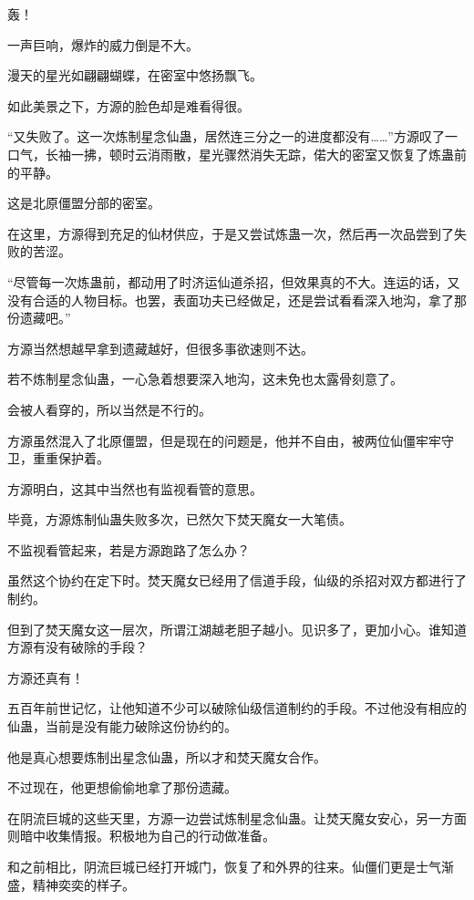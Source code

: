 
\begin{this_body}

轰！

一声巨响，爆炸的威力倒是不大。

漫天的星光如翩翩蝴蝶，在密室中悠扬飘飞。

如此美景之下，方源的脸色却是难看得很。

“又失败了。这一次炼制星念仙蛊，居然连三分之一的进度都没有……”方源叹了一口气，长袖一拂，顿时云消雨散，星光骤然消失无踪，偌大的密室又恢复了炼蛊前的平静。

这是北原僵盟分部的密室。

在这里，方源得到充足的仙材供应，于是又尝试炼蛊一次，然后再一次品尝到了失败的苦涩。

“尽管每一次炼蛊前，都动用了时济运仙道杀招，但效果真的不大。连运的话，又没有合适的人物目标。也罢，表面功夫已经做足，还是尝试看看深入地沟，拿了那份遗藏吧。”

方源当然想越早拿到遗藏越好，但很多事欲速则不达。

若不炼制星念仙蛊，一心急着想要深入地沟，这未免也太露骨刻意了。

会被人看穿的，所以当然是不行的。

方源虽然混入了北原僵盟，但是现在的问题是，他并不自由，被两位仙僵牢牢守卫，重重保护着。

方源明白，这其中当然也有监视看管的意思。

毕竟，方源炼制仙蛊失败多次，已然欠下焚天魔女一大笔债。

不监视看管起来，若是方源跑路了怎么办？

虽然这个协约在定下时。焚天魔女已经用了信道手段，仙级的杀招对双方都进行了制约。

但到了焚天魔女这一层次，所谓江湖越老胆子越小。见识多了，更加小心。谁知道方源有没有破除的手段？

方源还真有！

五百年前世记忆，让他知道不少可以破除仙级信道制约的手段。不过他没有相应的仙蛊，当前是没有能力破除这份协约的。

他是真心想要炼制出星念仙蛊，所以才和焚天魔女合作。

不过现在，他更想偷偷地拿了那份遗藏。

在阴流巨城的这些天里，方源一边尝试炼制星念仙蛊。让焚天魔女安心，另一方面则暗中收集情报。积极地为自己的行动做准备。

和之前相比，阴流巨城已经打开城门，恢复了和外界的往来。仙僵们更是士气渐盛，精神奕奕的样子。


\end{this_body}
